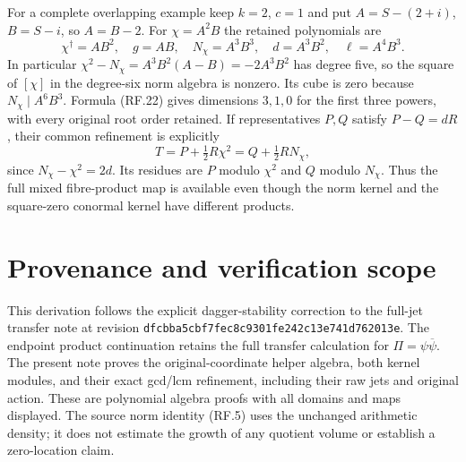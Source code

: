 \documentclass[11pt]{article}
\begin{document}
For a complete overlapping example keep $k=2$, $c=1$ and
put $A=S-(2+i)$, $B=S-i$, so $A=B-2$. For
$\chi=A^2B$ the retained polynomials are
\[
 \chi^\dagger=AB^2,\quad g=AB,\quad
 N_\chi=A^3B^3,\quad d=A^3B^2,\quad\ell=A^4B^3.
 \tag{RF.25}
\]
In particular
$\chi^2-N_\chi=A^3B^2(A-B)=-2A^3B^2$ has degree five,
so the square of $[\chi]$ in the degree-six norm algebra is
nonzero. Its cube is zero because $N_\chi\mid A^6B^3$.
Formula (RF.22) gives dimensions $3,1,0$ for the first three
powers, with every original root order retained. If representatives
$P,Q$ satisfy $P-Q=dR$, their common refinement is explicitly
\[
 T=P+\tfrac12R\chi^2=Q+\tfrac12RN_\chi,
 \tag{RF.26}
\]
since $N_\chi-\chi^2=2d$. Its residues are $P$ modulo
$\chi^2$ and $Q$ modulo $N_\chi$. Thus the full mixed
fibre-product map is available even though the norm kernel and
the square-zero conormal kernel have different products.

\section{Provenance and verification scope}

This derivation follows the explicit dagger-stability correction
to the full-jet transfer note at revision
\texttt{dfcbba5cbf7fec8c9301fe242c13e741d762013e}.
The endpoint product continuation retains the full transfer
calculation for $\Pi=\psi\overline\psi$. The present note proves
the original-coordinate helper algebra, both kernel modules,
and their exact gcd/lcm refinement, including their raw jets and
original action. These are polynomial algebra proofs with all
domains and maps displayed. The source norm identity (RF.5)
uses the unchanged arithmetic density; it does not estimate the
growth of any quotient volume or establish a zero-location claim.
\end{document}
